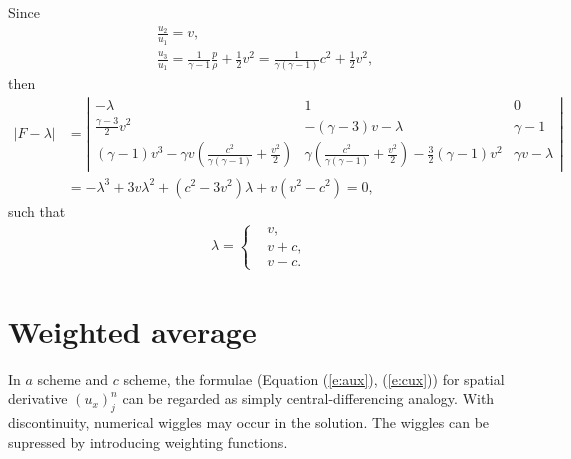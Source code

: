 \documentclass[letterpaper,12pt,dvips]{article}
\numberwithin{equation}{section}
\begin{document}
Since 
\begin{align*}
  & \frac{u_2}{u_1} = v, \\
  & \frac{u_3}{u_1} = \frac{1}{\gamma-1}\frac{p}{\rho} + \frac{1}{2}v^2
    = \frac{1}{\gamma(\gamma-1)}c^2 + \frac{1}{2}v^2, 
\end{align*}
then
\begin{align*}
  |F-\lambda| &= 
    \left|\begin{array}{ccc}
      -\lambda & 1 & 0 \\
      \frac{\gamma-3}{2}v^2 & 
      -(\gamma-3)v - \lambda & 
      \gamma-1 \\
      (\gamma-1)v^3 
        - \gamma v(\frac{c^2}{\gamma(\gamma-1)}+\frac{v^2}{2}) &
      \gamma(\frac{c^2}{\gamma(\gamma-1)}+\frac{v^2}{2})
        - \frac{3}{2}(\gamma-1)v^2 &
      \gamma v - \lambda
    \end{array}\right| \\
  &= -\lambda^3 + 3v\lambda^2 + (c^2-3v^2)\lambda + v(v^2-c^2) 
   = 0, 
\end{align*}
such that
\begin{align}
  \lambda = 
  \left\{\begin{aligned} 
    &v   , \\
    &v+c , \\
    &v-c .
  \end{aligned}\right. \label{e:euler_eigenvalue}
\end{align}

\section{Weighted average}
\label{s:weighted_average}

In $a$ scheme and $c$ scheme, the formulae (Equation (\ref{e:aux}),
(\ref{e:cux})) for spatial derivative $(u_x)_j^n$ can be regarded as 
simply central-differencing analogy\cite{b:chang95, b:chang03}.
With discontinuity, numerical wiggles may occur in the 
solution\cite{b:chang03}.
The wiggles can be supressed by introducing weighting 
functions\cite{b:chang95, b:chang03}.
\end{document}
